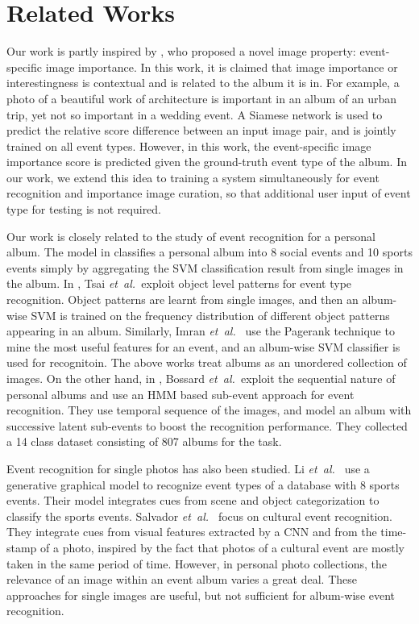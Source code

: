 \documentclass[runningheads]{llncs}
\newcommand{\etal}{\mbox{\emph{et al.\ }}}
\begin{document}
\section{Related Works}
Our work is partly inspired by \cite{CVPR}, who proposed a novel image property: event-specific image importance. In this work, it is claimed that image importance or interestingness is contextual and is related to the album it is in. For example, a photo of a beautiful work of architecture is important in an album of an urban trip, yet not so important in a wedding event.  A Siamese network is used to predict the relative score difference between an input image pair, and is 
 jointly trained on all event types.
However, in this work, the event-specific image importance score is predicted given the ground-truth event type of the album. In our work, we extend this idea to training a system simultaneously for event recognition and importance image curation, so that additional user input of event type for testing is not required.

Our work is closely related to the study of event recognition for a personal album. The model in \cite{Mattivi11} classifies a personal album into 8 social events and 10 sports events simply by aggregating the SVM classification result from single images in the album. In \cite{pattern}, Tsai \etal exploit object level patterns for event type recognition. Object patterns are learnt from single images,  and then an album-wise SVM is trained on the frequency distribution of different object patterns appearing in an album. Similarly, Imran \etal \cite{Imran09} use the Pagerank technique to mine the most useful features for an event, and an album-wise SVM classifier is used for recognitoin.
The above works treat albums as an unordered collection of images. On the other hand, in \cite{HMM}, Bossard \etal exploit the sequential nature of personal albums and use an HMM based sub-event approach for event recognition. They use temporal sequence of the images, and model an album with successive latent sub-events to boost the recognition performance.  They collected a 14 class dataset consisting of 807 albums for the task. 

Event recognition for single photos has also been studied.  Li \etal \cite{what_where} use a generative graphical model to recognize event types of a database with 8 sports events. Their model integrates cues from scene and object categorization to classify the sports events. Salvador \etal\cite{cSalvadora} focus on cultural event recognition. They integrate cues from visual features extracted by a CNN and from the time-stamp of a photo, inspired by the fact that photos of a cultural event are mostly taken in the same period of time. However, in personal photo collections, the relevance of an image within an event album varies a great deal. These approaches for single images are useful, but not sufficient for album-wise event recognition.
\end{document}
